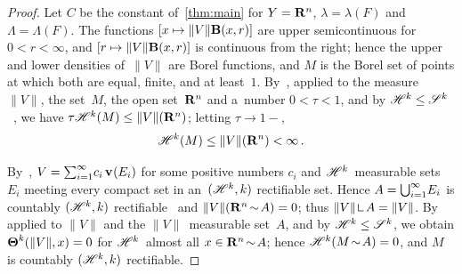 \documentclass[a4paper,twoside,leqno]{article}
\begin{document}
\begin{proof}
    Let $C$ be the constant of~\ref{thm:main} for $Y = \mathbf{R}^{n}$, $\lambda = \lambda(F)$ and
    $\Lambda = \Lambda(F)$. The functions $[x \mapsto \|V\| \mathbf{B}(x,r)]$ are upper
    semicontinuous for $0 < r < \infty$, and $[r \mapsto \|V\| \mathbf{B}(x,r)]$ is continuous from
    the right; hence the upper and lower densities of~$\|V\|$ are Borel functions, and $M$ is the
    Borel set of points at which both are equal, finite, and at least~$1$. By~\cite[2.10.19(3)]{Federer1969}, applied to the measure~$\|V\|$, the
    set~$M$, the open set~$\mathbf{R}^{n}$ and a~number $0 < \tau < 1$, and by $\mathscr{H}^{k} \le
    \mathscr{S}^{k}$~\cite[2.10.6]{Federer1969}, we have $\tau \mathscr{H}^{k}(M) \le
    \|V\|(\mathbf{R}^{n})$; letting $\tau \to 1-$,
    \begin{equation}
        \label{eq:MS:HM}
        \mathscr{H}^{k}(M) \le \|V\|(\mathbf{R}^{n}) < \infty \,.
    \end{equation}

    By~\cite[3.5]{Allard1972}, $V = {\textstyle\sum_{i=1}^{\infty}} c_i \, \mathbf{v}_{}(E_i)$ for some positive
    numbers $c_i$ and $\mathscr{H}^{k}$~measurable sets $E_i$ meeting every compact set in
    an~$(\mathscr{H}^{k},k)$ rectifiable set. Hence $A = {{\textstyle \bigcup}}_{i=1}^\infty E_i$ is countably
    $(\mathscr{H}^{k},k)$ rectifiable~\cite[3.2.14]{Federer1969} and $\|V\|(\mathbf{R}^{n} \!\sim\! A)
    = 0$; thus $\|V\| \restrict A = \|V\|$. By~\cite[2.10.19(4)]{Federer1969} applied to $\|V\|$
    and the $\|V\|$~measurable set~$A$, and by $\mathscr{H}^{k} \le \mathscr{S}^{k}$, we obtain
    $\boldsymbol{\Theta}^{k}(\|V\|,x) = 0$ for $\mathscr{H}^{k}$~almost all $x \in \mathbf{R}^{n} \!\sim\! A$;
    hence $\mathscr{H}^{k}(M \!\sim\!
    A) = 0$, and $M$ is countably $(\mathscr{H}^{k},k)$ rectifiable.


\end{proof}
\end{document}
